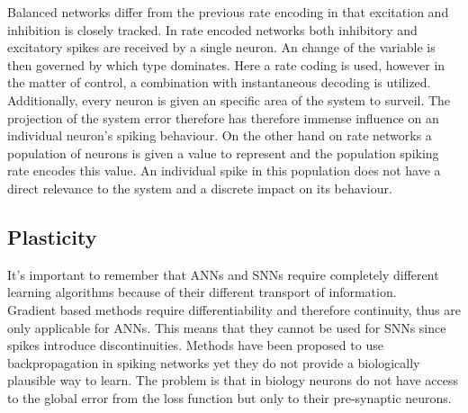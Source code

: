 Balanced networks differ from the previous rate encoding in that excitation and inhibition is closely tracked. In rate encoded networks both inhibitory and excitatory spikes are received by a single neuron. An change of the variable is then governed by which type dominates. Here a rate coding is used, however in the matter of control, a combination with instantaneous decoding is \cite{johnson_minimum-error_2016} utilized.\\
Additionally, every neuron is given an specific area of the system to surveil. The projection of the system error therefore has therefore immense influence on an individual neuron's spiking behaviour. On the other hand on rate networks a population of neurons is given a value to represent and the population spiking rate encodes this value. An individual spike in this population does not have a direct relevance to the system and a discrete impact on its behaviour.\\



\subsection{Plasticity}
It's important to remember that \acp{ANN} and \acp{SNN} require completely different learning algorithms because of their different transport of information.\\
Gradient based methods require differentiability and therefore continuity, thus are only applicable for \acp{ANN}. This means that they cannot be used for \acp{SNN} since spikes introduce discontinuities. Methods have been proposed to use backpropagation in spiking networks\cite{lee_training_2016} yet they do not provide a biologically plausible way to learn. The problem is that in biology neurons do not have access to the global error from the loss function but only to their pre-synaptic neurons.
